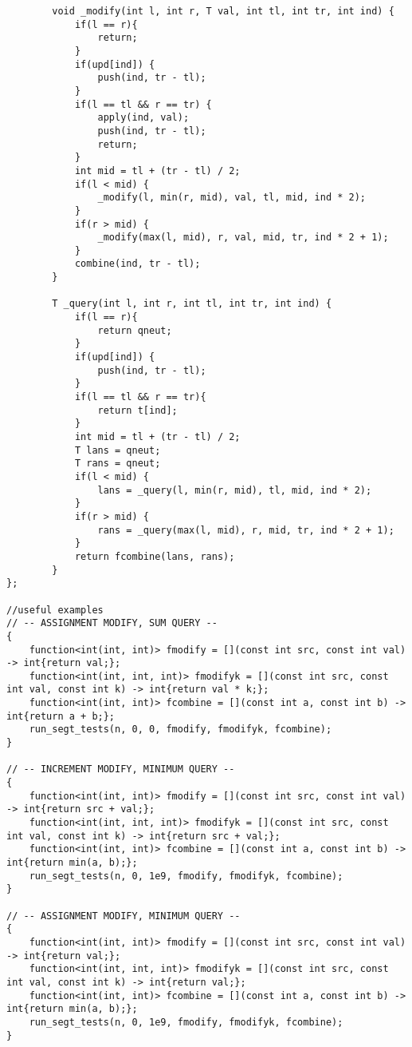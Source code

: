\documentclass[8pt, headheight=10pt]{scrartcl}
\begin{document}
\begin{multicols*}{3}
\begin{lstlisting}
        void _modify(int l, int r, T val, int tl, int tr, int ind) {
            if(l == r){
                return;
            }
            if(upd[ind]) {
                push(ind, tr - tl);
            }
            if(l == tl && r == tr) {
                apply(ind, val);
                push(ind, tr - tl);
                return;
            }
            int mid = tl + (tr - tl) / 2;
            if(l < mid) {
                _modify(l, min(r, mid), val, tl, mid, ind * 2);
            }
            if(r > mid) {
                _modify(max(l, mid), r, val, mid, tr, ind * 2 + 1);
            }
            combine(ind, tr - tl);
        }

        T _query(int l, int r, int tl, int tr, int ind) {
            if(l == r){
                return qneut;
            }  
            if(upd[ind]) {
                push(ind, tr - tl);
            }
            if(l == tl && r == tr){
                return t[ind];
            }
            int mid = tl + (tr - tl) / 2;
            T lans = qneut;
            T rans = qneut;
            if(l < mid) {
                lans = _query(l, min(r, mid), tl, mid, ind * 2);
            }
            if(r > mid) {
                rans = _query(max(l, mid), r, mid, tr, ind * 2 + 1);
            }
            return fcombine(lans, rans);
        }
};

//useful examples
// -- ASSIGNMENT MODIFY, SUM QUERY --
{
    function<int(int, int)> fmodify = [](const int src, const int val) -> int{return val;};
    function<int(int, int, int)> fmodifyk = [](const int src, const int val, const int k) -> int{return val * k;};
    function<int(int, int)> fcombine = [](const int a, const int b) -> int{return a + b;};
    run_segt_tests(n, 0, 0, fmodify, fmodifyk, fcombine);
}

// -- INCREMENT MODIFY, MINIMUM QUERY --
{
    function<int(int, int)> fmodify = [](const int src, const int val) -> int{return src + val;};
    function<int(int, int, int)> fmodifyk = [](const int src, const int val, const int k) -> int{return src + val;};
    function<int(int, int)> fcombine = [](const int a, const int b) -> int{return min(a, b);};
    run_segt_tests(n, 0, 1e9, fmodify, fmodifyk, fcombine);
}

// -- ASSIGNMENT MODIFY, MINIMUM QUERY --
{
    function<int(int, int)> fmodify = [](const int src, const int val) -> int{return val;};
    function<int(int, int, int)> fmodifyk = [](const int src, const int val, const int k) -> int{return val;};
    function<int(int, int)> fcombine = [](const int a, const int b) -> int{return min(a, b);};
    run_segt_tests(n, 0, 1e9, fmodify, fmodifyk, fcombine);
}


\end{lstlisting}
\end{multicols*}
\end{document}

